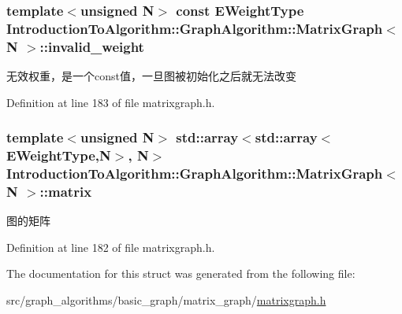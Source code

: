 \subsubsection[{invalid\+\_\+weight}]{\setlength{\rightskip}{0pt plus 5cm}template$<$unsigned N$>$ const {\bf E\+Weight\+Type} {\bf Introduction\+To\+Algorithm\+::\+Graph\+Algorithm\+::\+Matrix\+Graph}$<$ N $>$\+::invalid\+\_\+weight}\label{struct_introduction_to_algorithm_1_1_graph_algorithm_1_1_matrix_graph_accc79376e509d7ffa016ef5003512976}
无效权重，是一个const值，一旦图被初始化之后就无法改变 

Definition at line 183 of file matrixgraph.\+h.

\hypertarget{struct_introduction_to_algorithm_1_1_graph_algorithm_1_1_matrix_graph_ae1febbc0e4a86c325a16a942947a03bf}{}
\subsubsection[{matrix}]{\setlength{\rightskip}{0pt plus 5cm}template$<$unsigned N$>$ std\+::array$<$std\+::array$<${\bf E\+Weight\+Type},N$>$, N$>$ {\bf Introduction\+To\+Algorithm\+::\+Graph\+Algorithm\+::\+Matrix\+Graph}$<$ N $>$\+::matrix}\label{struct_introduction_to_algorithm_1_1_graph_algorithm_1_1_matrix_graph_ae1febbc0e4a86c325a16a942947a03bf}
图的矩阵 

Definition at line 182 of file matrixgraph.\+h.



The documentation for this struct was generated from the following file\+:\begin{DoxyCompactItemize}
\item 
src/graph\+\_\+algorithms/basic\+\_\+graph/matrix\+\_\+graph/\hyperlink{matrixgraph_8h}{matrixgraph.\+h}\end{DoxyCompactItemize}
